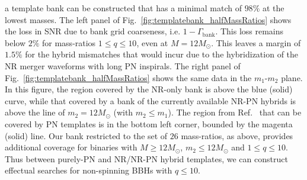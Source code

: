 a template bank can be constructed that has a minimal match of $98\%$
at the lowest masses. The left panel of Fig.~\ref{fig:templatebank_halfMassRatios}
shows the loss in SNR due to bank grid coarseness, i.e. $1-\Gamma_\mathrm{bank}$. 
This loss remains below $2\%$ for mass-ratios $1\leq q\leq 10$, even at 
$M=12M_\odot$. This 
leaves a margin of $1.5\%$ for the hybrid mismatches that would incur due to 
the hybridization of the NR merger waveforms with long PN inspirals. The right 
panel of Fig.~\ref{fig:templatebank_halfMassRatios} shows the same data in the 
$m_1$-$m_2$ plane. In this figure, 
the region covered by the NR-only bank is above the blue (solid) curve, while 
that covered by a bank of the currently available NR-PN hybrids is above the
line of $m_2 = 12M_\odot$ (with $m_2\leq m_1$). The region from 
Ref.~\cite{Brown:2012nn,CompTemplates2009} that can be covered by PN templates 
is in the bottom
left corner, bounded by the magenta (solid) line. Our bank restricted to the
set of $26$ mass-ratios, as above, provides additional coverage for binaries
with $M\geq 12M_\odot$, $m_2\leq 12M_\odot$ and $1\leq q\leq 10$.
Thus between purely-PN and NR/NR-PN hybrid templates, we can construct 
effectual searches for non-spinning BBHs with $q\leq 10$.

